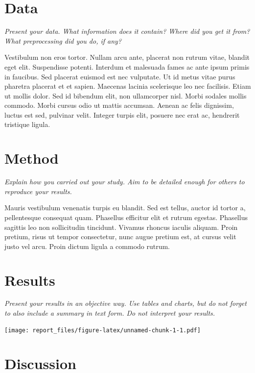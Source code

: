 \documentclass[
]{article}
\begin{document}
\hypertarget{data}{%
\section{Data}\label{data}}

\emph{Present your data. What information does it contain? Where did you
get it from? What preprocessing did you do, if any?}

Vestibulum non eros tortor. Nullam arcu ante, placerat non rutrum vitae,
blandit eget elit. Suspendisse potenti. Interdum et malesuada fames ac
ante ipsum primis in faucibus. Sed placerat euismod est nec vulputate.
Ut id metus vitae purus pharetra placerat et et sapien. Maecenas lacinia
scelerisque leo nec facilisis. Etiam ut mollis dolor. Sed id bibendum
elit, non ullamcorper nisl. Morbi sodales mollis commodo. Morbi cursus
odio ut mattis accumsan. Aenean ac felis dignissim, luctus est sed,
pulvinar velit. Integer turpis elit, posuere nec erat ac, hendrerit
tristique ligula.

\hypertarget{method}{%
\section{Method}\label{method}}

\emph{Explain how you carried out your study. Aim to be detailed enough
for others to reproduce your results.}

Mauris vestibulum venenatis turpis eu blandit. Sed est tellus, auctor id
tortor a, pellentesque consequat quam. Phasellus efficitur elit et
rutrum egestas. Phasellus sagittis leo non sollicitudin tincidunt.
Vivamus rhoncus iaculis aliquam. Proin pretium, risus ut tempor
consectetur, nunc augue pretium est, at cursus velit justo vel arcu.
Proin dictum ligula a commodo rutrum.

\hypertarget{results}{%
\section{Results}\label{results}}

\emph{Present your results in an objective way. Use tables and charts,
but do not forget to also include a summary in text form. Do not
interpret your results.}

\texttt{[image: report\_files/figure-latex/unnamed-chunk-1-1.pdf]}

\hypertarget{discussion}{%
\section{Discussion}\label{discussion}}
\end{document}
